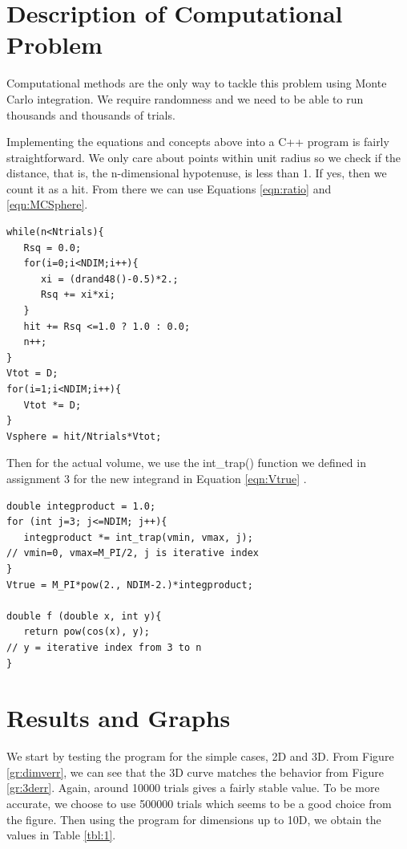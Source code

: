 \documentclass[aps,prl,twocolumn,superscriptaddress]{revtex4-1}
\begin{document}
\section{Description of Computational Problem} 
Computational methods are the only way to tackle this problem using Monte Carlo integration. We require randomness and we need to be able to run thousands and thousands of trials.

Implementing the equations and concepts above into a C++ program is fairly straightforward. We only care about points within unit radius so we check if the distance, that is, the n-dimensional hypotenuse, is less than 1. If yes, then we count it as a hit. From there we can use Equations \ref{eqn:ratio} and \ref{eqn:MCSphere}.
\begin{lstlisting}
while(n<Ntrials){ 
   Rsq = 0.0;
   for(i=0;i<NDIM;i++){
      xi = (drand48()-0.5)*2.;
	  Rsq += xi*xi;
   }
   hit += Rsq <=1.0 ? 1.0 : 0.0;
   n++;	
}
Vtot = D;
for(i=1;i<NDIM;i++){
   Vtot *= D;
}
Vsphere = hit/Ntrials*Vtot;
\end{lstlisting}
Then for the actual volume, we use the int\_trap() function we defined in assignment 3 for the new integrand in Equation \ref{eqn:Vtrue} \cite{integ}.
\begin{lstlisting}
double integproduct = 1.0;
for (int j=3; j<=NDIM; j++){
   integproduct *= int_trap(vmin, vmax, j);
// vmin=0, vmax=M_PI/2, j is iterative index
}
Vtrue = M_PI*pow(2., NDIM-2.)*integproduct;

double f (double x, int y){ 
   return pow(cos(x), y);	
// y = iterative index from 3 to n
}
\end{lstlisting}

\section{Results and Graphs}
We start by testing the program for the simple cases, 2D and 3D. From Figure \ref{gr:dimverr}, we can see that the 3D curve matches the behavior from Figure \ref{gr:3derr}. Again, around 10000 trials gives a fairly stable value. To be more accurate, we choose to use 500000 trials which seems to be a good choice from the figure. Then using the program for dimensions up to 10D, we obtain the values in Table \ref{tbl:1}. 
\end{document}

